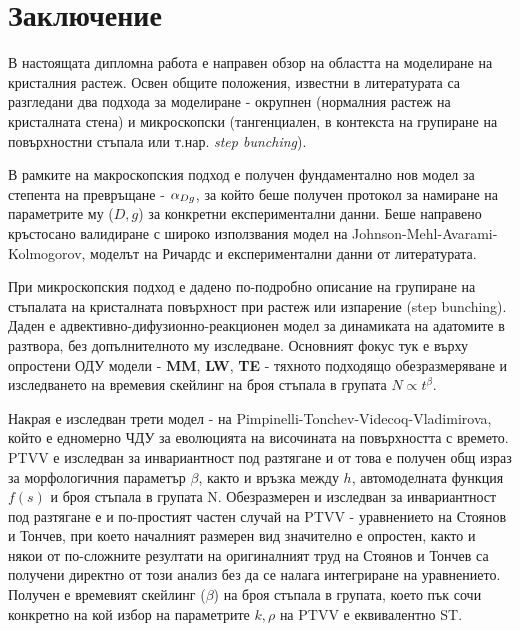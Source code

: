 \section{Заключение}
В настоящата дипломна работа е направен обзор на областта на моделиране на кристалния растеж. Освен общите положения, известни в литературата са разгледани два подхода за моделиране - окрупнен (нормалния растеж на кристалната стена) и микроскопски (тангенциален, в контекста на групиране на повърхностни стъпала или т.нар. \textit{step bunching}).

В рамките на макроскопския подход е получен фундаментално нов модел за степента на превръщане - $\alpha_{Dg}$, за който беше получен протокол за намиране на параметрите му ($D, g$) за конкретни експериментални данни. Беше направено кръстосано валидиране с широко използвания модел на Johnson-Mehl-Avarami-Kolmogorov, моделът на Ричардс и експериментални данни от литературата.

При микроскопския подход е дадено по-подробно описание на групиране на стъпалата на кристалната повърхност при растеж или изпарение (step bunching). Даден е адвективно-дифузионно-реакционен модел за динамиката на адатомите в разтвора, без допълнителното му изследване. Основният фокус тук е върху опростени ОДУ модели - \textbf{MM}, \textbf{LW}, \textbf{TE} - тяхното подходящо обезразмеряване и изследването на времевия скейлинг на броя стъпала в групата $N \propto t^\beta$. 

Накрая е изследван трети модел - на Pimpinelli-Tonchev-Videcoq-Vladimirova, който е едномерно ЧДУ за еволюцията на височината на повърхността с времето.  PTVV е изследван за инвариантност под разтягане и от това е получен общ израз за морфологичния параметър $\beta$, както и връзка между $h$, автомоделната функция $f(s)$ и броя стъпала в групата N. Обезразмерен и изследван за инвариантност под разтягане е и по-простият частен случай на PTVV - уравнението на Стоянов и Тончев, при което началният размерен вид значително е опростен, както и някои от по-сложните резултати на оригиналният труд на Стоянов и Тончев са получени директно от този анализ без да се налага интегриране на уравнението. Получен е времевият скейлинг ($\beta$) на броя стъпала в групата, което пък сочи конкретно на кой избор на параметрите $k, \rho$ на PTVV е еквивалентно ST.
